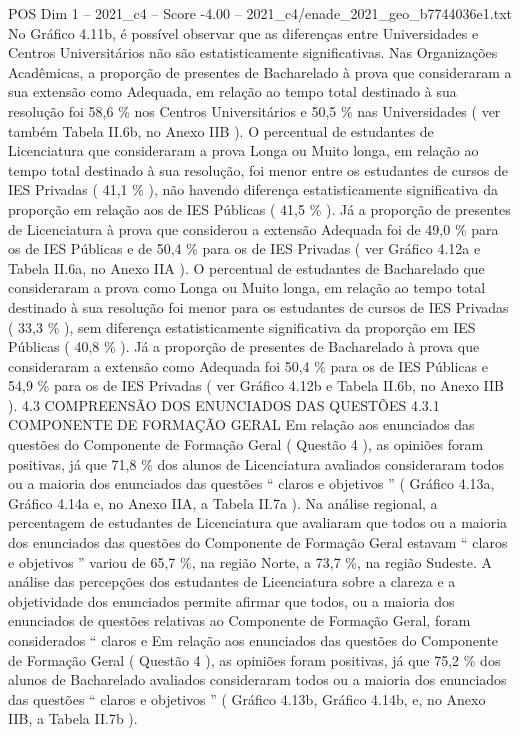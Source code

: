 \begin{textsample}{POS Dim 1 – 2021\_c4 – Score -4.00 – 2021\_c4/enade\_2021\_geo\_b7744036e1.txt}
No Gráfico 4.11b, é possível observar que as diferenças entre Universidades e Centros Universitários não são estatisticamente significativas.
Nas Organizações Acadêmicas, a proporção de presentes de Bacharelado à prova que consideraram a sua extensão como Adequada, em relação ao tempo total destinado à sua resolução foi 58,6 \% nos Centros Universitários e 50,5 \% nas Universidades ( ver também Tabela II.6b, no Anexo IIB ).
O percentual de estudantes de Licenciatura que consideraram a prova Longa ou Muito longa, em relação ao tempo total destinado à sua resolução, foi menor entre os estudantes de cursos de IES Privadas ( 41,1 \% ), não havendo diferença estatisticamente significativa da proporção em relação aos de IES Públicas ( 41,5 \% ).
Já a proporção de presentes de Licenciatura à prova que considerou a extensão Adequada foi de 49,0 \% para os de IES Públicas e de 50,4 \% para os de IES Privadas ( ver Gráfico 4.12a e Tabela II.6a, no Anexo IIA ).
O percentual de estudantes de Bacharelado que consideraram a prova como Longa ou Muito longa, em relação ao tempo total destinado à sua resolução foi menor para os estudantes de cursos de IES Privadas ( 33,3 \% ), sem diferença estatisticamente significativa da proporção em IES Públicas ( 40,8 \% ).
Já a proporção de presentes de Bacharelado à prova que consideraram a extensão como Adequada foi 50,4 \% para os de IES Públicas e 54,9 \% para os de IES Privadas ( ver Gráfico 4.12b e Tabela II.6b, no Anexo IIB ). 4.3 COMPREENSÃO DOS ENUNCIADOS DAS QUESTÕES 4.3.1 COMPONENTE DE FORMAÇÃO GERAL Em relação aos enunciados das questões do Componente de Formação Geral ( Questão 4 ), as opiniões foram positivas, já que 71,8 \% dos alunos de Licenciatura avaliados consideraram todos ou a maioria dos enunciados das questões “ claros e objetivos ” ( Gráfico 4.13a, Gráfico 4.14a e, no Anexo IIA, a Tabela II.7a ).
Na análise regional, a percentagem de estudantes de Licenciatura que avaliaram que todos ou a maioria dos enunciados das questões do Componente de Formação Geral estavam “ claros e objetivos ” variou de 65,7 \%, na região Norte, a 73,7 \%, na região Sudeste.
A análise das percepções dos estudantes de Licenciatura sobre a clareza e a objetividade dos enunciados permite afirmar que todos, ou a maioria dos enunciados de questões relativas ao Componente de Formação Geral, foram considerados “ claros e Em relação aos enunciados das questões do Componente de Formação Geral ( Questão 4 ), as opiniões foram positivas, já que 75,2 \% dos alunos de Bacharelado avaliados consideraram todos ou a maioria dos enunciados das questões “ claros e objetivos ” ( Gráfico 4.13b, Gráfico 4.14b, e, no Anexo IIB, a Tabela II.7b ).

\end{textsample}

